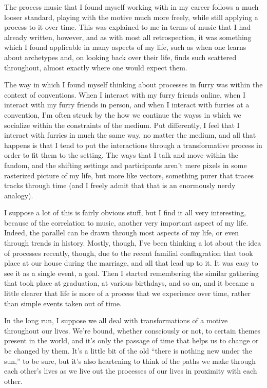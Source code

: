 The process music that I found myself working with in my career follows a much looser standard, playing with the motive much more freely, while still applying a process to it over time. This was explained to me in terms of music that I had already written, however, and as with most all retrospection, it was something which I found applicable in many aspects of my life, such as when one learns about archetypes and, on looking back over their life, finds such scattered throughout, almost exactly where one would expect them.

The way in which I found myself thinking about processes in furry was within the context of conventions. When I interact with my furry friends online, when I interact with my furry friends in person, and when I interact with furries at a convention, I'm often struck by the how we continue the wayss in which we socialize within the constraints of the medium. Put differently, I feel that I interact with furries in much the same way, no matter the medium, and all that happens is that I tend to put the interactions through a transformative process in order to fit them to the setting. The ways that I talk and move within the fandom, and the shifting settings and participants aren't mere pixels in some rasterized picture of my life, but more like vectors, something purer that traces tracks through time (and I freely admit that that is an enormously nerdy analogy).

I suppose a lot of this is fairly obvious stuff, but I find it all very interesting, because of the correlation to music, another very important aspect of my life. Indeed, the parallel can be drawn through most aspects of my life, or even through trends in history. Mostly, though, I've been thinking a lot about the idea of processes recently, though, due to the recent familial conflagration that took place at our house during the marriage, and all that lead up to it. It was easy to see it as a single event, a goal. Then I started remembering the similar gathering that took place at graduation, at various birthdays, and so on, and it became a little clearer that life is more of a process that we experience over time, rather than simple events taken out of time.

In the long run, I suppose we all deal with transformations of a motive throughout our lives. We're bound, whether consciously or not, to certain themes present in the world, and it's only the passage of time that helps us to change or be changed by them. It's a little bit of the old ``there is nothing new under the sun,'' to be sure, but it's also heartening to think of the paths we make through each other's lives as we live out the processes of our lives in proximity with each other.

